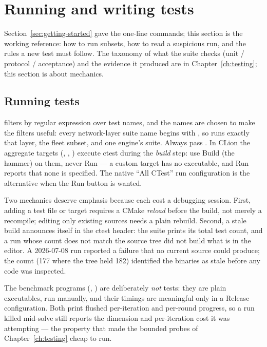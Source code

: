 \section{Running and writing tests}
\label{sec:tests}

Section~\ref{sec:getting-started} gave the one-line commands; this section
is the working reference: how to run subsets, how to read a suspicious
run, and the rules a new test must follow. The taxonomy of what the suite
checks (unit / protocol / acceptance) and the evidence it produced are in
Chapter~\ref{ch:testing}; this section is about mechanics.

\subsection{Running tests}

 filters by regular expression over test names, and the names
are chosen to make the filters useful: every network-layer suite name
begins with , so  runs exactly
that layer,  the fleet subset, and
 one engine's suite. Always pass
. In CLion the aggregate targets
(, ,
) execute ctest during the \emph{build} step:
use Build (the hammer) on them, never Run --- a custom target has no
executable, and Run reports that none is specified. The native ``All
CTest'' run configuration is the alternative when the Run button is
wanted.

Two mechanics deserve emphasis because each cost a debugging session.
First, adding a test file or target requires a CMake \emph{reload} before
the build, not merely a recompile; editing only existing sources needs a
plain rebuild. Second, a stale build announces itself in the ctest
header: the suite prints its total test count, and a run whose count does
not match the source tree did not build what is in the editor. A
2026-07-08 run reported a failure that no current source could produce;
the count (177 where the tree held 182) identified the binaries as stale
before any code was inspected.

The benchmark programs (,
) are deliberately \emph{not} tests: they are
plain executables, run manually, and their timings are meaningful only in
a Release configuration. Both print flushed per-iteration and per-round
progress, so a run killed mid-solve still reports the dimension and
per-iteration cost it was attempting --- the property that made the
bounded probes of Chapter~\ref{ch:testing} cheap to run.


